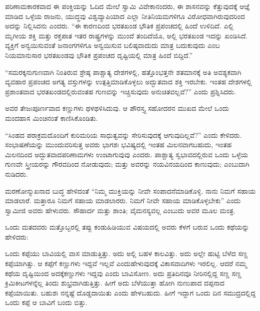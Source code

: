 \vskip 5pt

ಪರಿಣಾಮಕಾರಕವಾದ ಈ ಪಂಕ್ತಿಯನ್ನು ಓದಿದ ಮೇಲೆ ಸ್ವಾಮಿ ವಿವೇಕಾನಂದರು, ಈ ಶಾಸನವನ್ನು ಕೆತ್ತುವುದಕ್ಕೆ ಆಜ್ಞೆ ಮಾಡಿದ ಒಳ್ಳೆಯ ರಾಜನು, ಯುದ್ಧವು ವಿಶ್ವವ್ಯಾಪಿಯಾದ ಎಲ್ಲಾ ನೀತಿನಿಯಮಗಳಿಗೂ ವಿರೋಧವಾಗಿರುವುದರಿಂದ ಅದನ್ನು ನಿಲ್ಲಿಸಿದನು ಎಂದರು. “ಈ ಕಾರಣದಿಂದ ಭರತಖಂಡ ಭೌತಿಕ ಪ್ರಪಂಚದಲ್ಲಿ ಹಿಂದೆ ಉಳಿದಿದೆ. ಎಲ್ಲಿ ಮೃಗೀಯ ಶಕ್ತಿ ಮತ್ತು ರಕ್ತಪಾತ ಇತರ ರಾಷ್ಟ್ರಗಳನ್ನು ಮುಂದೆ ತಂದಿದೆಯೊ, ಅಲ್ಲಿ ಭರತಖಂಡ ಇದನ್ನು ಖಂಡಿಸಿದೆ. ವ್ಯಕ್ತಿಗೆ ಅನ್ವಯಿಸುವಂತೆ ಜನಾಂಗಗಳಿಗೂ ಅನ್ವಯಿಸುವ ಬಲಿಷ್ಠವಾದುದು ಮಾತ್ರ ಬದುಕುವುದು ಎಂಬ ನಿಯಮಾನುಸಾರ ಭರತಖಂಡವು ಭೌತಿಕ ಪ್ರಪಂಚದ ದೃಷ್ಟಿಯಲ್ಲಿ ಮಾತ್ರ ಹಿಂದೆ ಬಿದ್ದಿದೆ.”

\vskip 5pt

“ಸಮರಕ್ಕನುಗುಣವಾಗಿ ನಿಂತಿರುವ ಶ್ರೇಷ್ಠ ಪಾಶ್ಚಾತ್ಯ ದೇಶಗಳಲ್ಲಿ, ಹತ್ತೊಂಭತ್ತನೇ ಶತಮಾನಕ್ಕೆ ಅತಿ ಅವಶ್ಯಕವಾಗಿ ವ್ಯವಹಾರ ಪ್ರಪಂಚದ ಅಗತ್ಯ ವಸ್ತುಗಳನ್ನು ಉತ್ಪತ್ತಿಮಾಡಿಕೊಳ್ಳಲು ಅದ್ಭುತವಾದ ಶಕ್ತಿ ಇರಬೇಕು. ಇಂತಹ ದೇಶಗಳಲ್ಲಿ ಪ್ರಶಾಂತವಾದ ಭರತಖಂಡದಲ್ಲಿರುವಂತಹ ಗುಣವನ್ನು ಇಚ್ಚಿಸುವುದು ಅನುಚಿತವಲ್ಲವೆ?” ಎಂದು ಪ್ರಶ್ನಿಸಿದರು.

\vskip 5pt

ಅವರ ತೇಜಃಪೂರ್ಣವಾದ ಕಣ್ಣುಗಳು ಥಳಥಳಿಸಿದುವು. ಆ ಪೌರಸ್ತ್ಯ ಸಹೋದರನ ಮುಖದ ಮೇಲೆ ಒಂದು ಮಂದಹಾಸ ಮಿಂಚಿನಂತೆ ಕಾಣಿಸಿಕೊಂಡಿತು.

\vskip 5pt

“ಸಿಂಹದ ಪರಾಕ್ರಮದೊಂದಿಗೆ ಕುರಿಮರಿಯ ಸಾಧುತ್ವವನ್ನು ಸೇರಿಸುವುದಕ್ಕೆ ಆಗುವುದಿಲ್ಲವೆ?” ಎಂದು ಕೇಳಿದರು. ಸಂಭಾಷಣೆಯನ್ನು ಮುಂದುವರಿಸುತ್ತ ಅವರು ಭಾಗಶಃ ಭವಿಷ್ಯದಲ್ಲಿ ಇಂತಹ ಮಿಲನವಾಗಬಹುದು, ಇಂತಹ ಮಿಲನದಿಂದ ಅದ್ಭುತವಾದ\break ಪರಿಣಾಮಗಳು ಉಂಟಾಗುವುವು ಎಂದರು. ಪಾಶ್ಚಾತ್ಯ ಸ್ವಭಾವದಲ್ಲಿರುವ ಒಂದು ಒಳ್ಳೆಯ ಗುಣವೇ ಸ್ತ್ರೀಯರನ್ನು ಗೌರವದಿಂದ ನೋಡುವುದು; ಮತ್ತು ಅವರನ್ನು ನಯವಿನಯದಿಂದ ಕಾಣುವುದು; ಎಂಬುದಾಗಿ ನುಡಿದರು.

\vskip 5pt

ಮರಣೋನ್ಮುಖನಾದ ಬುದ್ಧ ಹೇಳಿದಂತೆ “ನಿಮ್ಮ ಮುಕ್ತಿಯನ್ನು ನೀವೇ ಸಂಪಾದನೆ\break ಮಾಡಿಕೊಳ್ಳಿ. ನಾನು ನಿಮಗೆ ಸಹಾಯ ಮಾಡಲಾರೆ. ಮತ್ತಾರೂ ನಿಮಗೆ ಸಹಾಯ ಮಾಡಲಾರರು. ನಿಮಗೆ ನೀವೇ ಸಹಾಯ ಮಾಡಿಕೊಳ್ಳಬೇಕು” ಎಂದು ಸ್ವಾಮೀಜಿ ಅವರು ಹೇಳುವರು. ಸೌಹಾರ್ದ ಮತ್ತು ಶಾಂತಿ; ವೈಮನಸ್ಯವಲ್ಲ ಎಂಬುದು ಅವರ ಮೂಲ ಮಂತ್ರ.

\vskip 5pt

ಒಂದು ಮತದವರು ಮತ್ತೊಬ್ಬರಲ್ಲಿ ತಪ್ಪು ಕಂಡುಹಿಡಿಯುವ ವಿಷಯದಲ್ಲಿ ಅವರು ಕೆಳಗೆ ಬರುವ ಒಂದು ಕಥೆಯನ್ನು ಹೇಳಿದರು:

\eject

ಒಂದು ಕಪ್ಪೆಯು ಬಾವಿಯಲ್ಲಿ ವಾಸ ಮಾಡುತ್ತಿತ್ತು. ಅದು ಅಲ್ಲಿ ಬಹಳ ಕಾಲವಿತ್ತು. ಅದು ಅಲ್ಲೇ ಹುಟ್ಟಿ ಬೆಳೆದ ಸಣ್ಣ ಕಪ್ಪೆಯಾಗಿತ್ತು. ಆ ಕಪ್ಪೆಗೆ ಕಣ್ಣುಗಳು ಇದ್ದವೆ ಇಲ್ಲವೆ ಎಂದು\break ಹೇಳುವುದಕ್ಕೆ ವಿಕಾಸವಾದಿಗಳು ಇರಲಿಲ್ಲ. ಆದರೆ ನಮ್ಮ ಕಥೆಯ ದೃಷ್ಟಿಯಿಂದ ಅದಕ್ಕೆ\break ಕಣ್ಣುಗಳು ಇದ್ದವು ಎಂದು ಬಾವಿಸೋಣ. ಅದು ಪ್ರತಿದಿನವೂ ನೀರಿನಲ್ಲಿದ್ದ ಸಣ್ಣ ಸಣ್ಣ ಕ್ರಿಮಿಕೀಟಗಳನ್ನೆಲ್ಲ ತಿಂದು ಶುಭ್ರವಾಗಿಡುತ್ತಿತ್ತು. ಹೀಗೆ ಅದು ಬೆಳೆಯುತ್ತಾ ಹೋಗಿ ನುಣುಪಾದ ದಪ್ಪನಾದ ಕಪ್ಪೆಯಾಯಿತು. ಬಹುಶಃ ನನ್ನಷ್ಟೆ ದೊಡ್ಡದಾಯಿತು ಎಂದು ಹೇಳಬಹುದು. ಹೀಗೆ ಇದ್ದಾಗ ಒಂದು ದಿನ ಸಮುದ್ರದಲ್ಲಿದ್ದ ಒಂದು ಕಪ್ಪೆ ಆ ಬಾವಿಗೆ ಬಂದು ಬಿತ್ತು.


